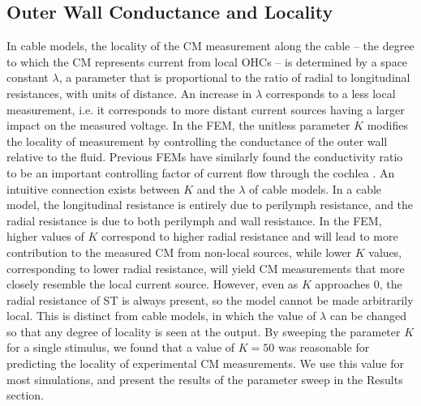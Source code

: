 \documentclass{biophys-new}
\begin{document}
\subsection{Outer Wall Conductance and Locality}
\par{In cable models, the locality of the CM measurement along the cable -- the degree to which the CM represents current from local OHCs -- is determined by a space constant $\lambda$, a parameter that is proportional to the ratio of radial to longitudinal resistances, with units of distance. An increase in $\lambda$ corresponds to a less local measurement, i.e. it corresponds to more distant current sources having a larger impact on the measured voltage. In the FEM, the unitless parameter $K$  modifies the locality of measurement by controlling the conductance of the outer wall relative to the fluid. Previous FEMs have similarly found the conductivity ratio to be an important controlling factor of current flow through the cochlea \cite{nogueira}. An intuitive connection exists between $K$ and the $\lambda$ of cable models. In a cable model, the longitudinal resistance is entirely due to perilymph resistance, and the radial resistance is due to both perilymph and wall resistance. In the FEM, higher values of $K$ correspond to higher radial resistance and will lead to more contribution to the measured CM from non-local sources, while lower $K$ values, corresponding to lower radial resistance, will yield CM measurements that more closely resemble the local current source. However, even as $K$ approaches 0, the radial resistance of ST is always present, so the model cannot be made arbitrarily local. This is distinct from cable models, in which the value of $\lambda$ can be changed so that any degree of locality is seen at the output. By sweeping the parameter $K$ for a single stimulus, we found that a value of $K=50$ was reasonable for predicting the locality of experimental CM measurements. We use this value for most simulations, and present the results of the parameter sweep in the Results section.}
\end{document}
